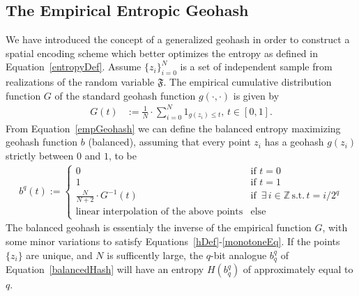 \documentclass[nips13submit_09,times,art10]{article} %
\begin{document}
\subsection{The Empirical Entropic Geohash}

We have introduced the concept of a generalized geohash in order to construct a spatial encoding
scheme which better optimizes the entropy as defined in Equation~\ref{entropyDef}.
Assume $\{z_i\}_{i=0}^N$ is a set of independent sample from realizations of the random variable
$\mathfrak{F}$. The empirical cumulative distribution function $G$ of the standard geohash function
$g(\cdot, \cdot)$ is given by
\begin{align}
G(t) &:= \frac{1}{N} \cdot \sum_{i=0}^{N} 1_{g(z_i) \leq t}, \, t \in [0,1]. \label{empGeohash}
\end{align}
From Equation~\ref{empGeohash} we can define the balanced entropy maximizing geohash function
$b$ (balanced), assuming that every point $z_i$ has a geohash $g(z_i)$ strictly between $0$ and
$1$, to be
\begin{align}
b^q(t) :=
  \begin{cases}
    0 &\mbox{if } t = 0\\
    1 &\mbox{if } t = 1\\
    \frac{N}{N+2} \cdot G^{-1}(t) &\mbox{if } \, \exists \, i \in \mathbb{Z} \, \text{s.t.} \, t = i / 2^{q} \\
    \text{linear interpolation of the above points} & \text{else}
  \end{cases} \label{balancedHash}
\end{align}
The balanced geohash is essentialy the inverse of the empirical function $G$, with some minor
variations to satisfy Equations~\ref{hDef}-\ref{monotoneEq}.
If the points $\{z_i\}$ are unique, and $N$ is sufficently large, the $q$-bit analogue $b_q^q$
of Equation~\ref{balancedHash} will have an entropy $H(b_q^q)$ of approximately equal to $q$.
\end{document}
